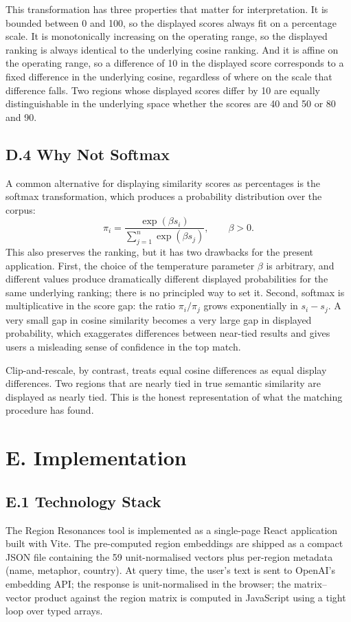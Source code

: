 \documentclass[11pt]{article}
\begin{document}
This transformation has three properties that matter for interpretation. It is bounded between 0 and 100, so the displayed scores always fit on a percentage scale. It is monotonically increasing on the operating range, so the displayed ranking is always identical to the underlying cosine ranking. And it is affine on the operating range, so a difference of 10 in the displayed score corresponds to a fixed difference in the underlying cosine, regardless of where on the scale that difference falls. Two regions whose displayed scores differ by 10 are equally distinguishable in the underlying space whether the scores are 40 and 50 or 80 and 90.

\subsection*{D.4 Why Not Softmax}
A common alternative for displaying similarity scores as percentages is the softmax transformation, which produces a probability distribution over the corpus:
\[
\pi_i = \frac{\exp(\beta s_i)}{\sum_{j=1}^{n} \exp(\beta s_j)}, \qquad \beta > 0.
\]
This also preserves the ranking, but it has two drawbacks for the present application. First, the choice of the temperature parameter $\beta$ is arbitrary, and different values produce dramatically different displayed probabilities for the same underlying ranking; there is no principled way to set it. Second, softmax is multiplicative in the score gap: the ratio $\pi_i / \pi_j$ grows exponentially in $s_i - s_j$. A very small gap in cosine similarity becomes a very large gap in displayed probability, which exaggerates differences between near-tied results and gives users a misleading sense of confidence in the top match.

Clip-and-rescale, by contrast, treats equal cosine differences as equal display differences. Two regions that are nearly tied in true semantic similarity are displayed as nearly tied. This is the honest representation of what the matching procedure has found.

\section*{E. Implementation}

\subsection*{E.1 Technology Stack}
The Region Resonances tool is implemented as a single-page React application built with Vite. The pre-computed region embeddings are shipped as a compact JSON file containing the 59 unit-normalised vectors plus per-region metadata (name, metaphor, country). At query time, the user's text is sent to OpenAI's embedding API; the response is unit-normalised in the browser; the matrix--vector product against the region matrix is computed in JavaScript using a tight loop over typed arrays.
\end{document}
